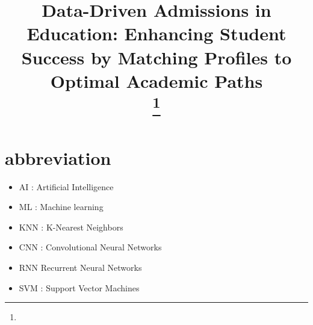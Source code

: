 \documentclass[conference]{IEEEtran}
\begin{document}
\title{Data-Driven Admissions in Education: Enhancing Student Success by Matching Profiles to Optimal Academic Paths\\
{\footnotesize \textsuperscript{}}
\thanks{}
}

\author{
}
\maketitle

\section*{abbreviation}
\begin{itemize}
    \item[] AI : Artificial Intelligence
    \item[] ML : Machine learning
    \item[] KNN : K-Nearest Neighbors
    \item[] CNN : Convolutional Neural Networks 
    \item[] RNN Recurrent Neural Networks 
    \item[] SVM : Support Vector Machines 
\end{itemize}


\vspace{16pt}
\end{document}
